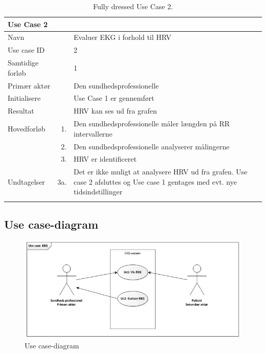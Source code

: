 \begin{longtabu} to  %
    {\large \textbf{Use Case 2}} && \\
    \toprule
    Navn &&    Evaluer EKG i forhold til HRV\\
    Use case ID &&    2\\
    Samtidige forløb &&    1\\
    Primær aktør &&    Den sundhedsprofessionelle\\
    Initialisere &&    Use Case 1 er gennemført   \\
    Resultat &&   HRV kan ses ud fra grafen \\ \midrule
    Hovedforløb &    1. &    Den sundhedsprofessionelle måler længden på RR intervallerne\\[-1ex]	
                &    2. &    Den sundhedsprofessionelle analyserer målingerne\\[-1ex]
                &    3. &    HRV er identificeret\\ \midrule
                
    Undtagelser &    3a. &    Det er ikke muligt at analysere HRV ud fra grafen. Use case 2 afsluttes og Use case 1 gentages med evt. nye tidsindstillinger \\ \bottomrule
\caption{Fully dressed Use Case 2.}
\label{UC2}
\end{longtabu}

\subsection{Use case-diagram}

\begin{figure}[htb]
	\centering
	\includegraphics[width=1\textwidth]{Figurer/Snip20150226_2}
	\caption{Use case-diagram}
	\label{fig:Use Cases}
\end{figure}

